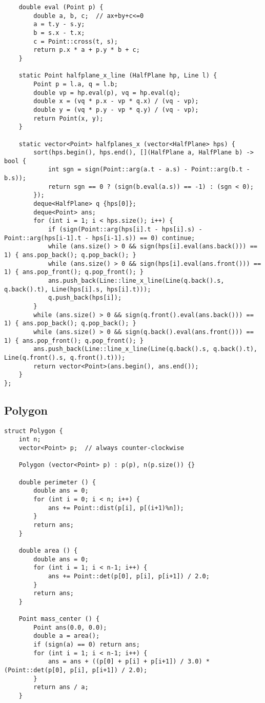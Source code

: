 \documentclass[10pt,landscape]{article}
\begin{document}
\begin{multicols}{2}
\begin{lstlisting}
	double eval (Point p) {
		double a, b, c;  // ax+by+c<=0
		a = t.y - s.y;
		b = s.x - t.x;
		c = Point::cross(t, s);
		return p.x * a + p.y * b + c;
	}

	static Point halfplane_x_line (HalfPlane hp, Line l) {
		Point p = l.a, q = l.b;
		double vp = hp.eval(p), vq = hp.eval(q);
		double x = (vq * p.x - vp * q.x) / (vq - vp);
		double y = (vq * p.y - vp * q.y) / (vq - vp);
		return Point(x, y);
	}

	static vector<Point> halfplanes_x (vector<HalfPlane> hps) {
		sort(hps.begin(), hps.end(), [](HalfPlane a, HalfPlane b) -> bool {
			int sgn = sign(Point::arg(a.t - a.s) - Point::arg(b.t - b.s));
			return sgn == 0 ? (sign(b.eval(a.s)) == -1) : (sgn < 0);
		});
		deque<HalfPlane> q {hps[0]};
		deque<Point> ans;
		for (int i = 1; i < hps.size(); i++) {
			if (sign(Point::arg(hps[i].t - hps[i].s) - Point::arg(hps[i-1].t - hps[i-1].s)) == 0) continue;
			while (ans.size() > 0 && sign(hps[i].eval(ans.back())) == 1) { ans.pop_back(); q.pop_back(); }
			while (ans.size() > 0 && sign(hps[i].eval(ans.front())) == 1) { ans.pop_front(); q.pop_front(); }
			ans.push_back(Line::line_x_line(Line(q.back().s, q.back().t), Line(hps[i].s, hps[i].t)));
			q.push_back(hps[i]);
		}
		while (ans.size() > 0 && sign(q.front().eval(ans.back())) == 1) { ans.pop_back(); q.pop_back(); }
		while (ans.size() > 0 && sign(q.back().eval(ans.front())) == 1) { ans.pop_front(); q.pop_front(); }
		ans.push_back(Line::line_x_line(Line(q.back().s, q.back().t), Line(q.front().s, q.front().t)));
		return vector<Point>(ans.begin(), ans.end());
	}
};
\end{lstlisting}
\subsection{Polygon}
\begin{lstlisting}
struct Polygon {
	int n;
	vector<Point> p;  // always counter-clockwise

	Polygon (vector<Point> p) : p(p), n(p.size()) {}

	double perimeter () {
		double ans = 0;
		for (int i = 0; i < n; i++) {
			ans += Point::dist(p[i], p[(i+1)%n]);
		}
		return ans;
	}

	double area () {
		double ans = 0;
		for (int i = 1; i < n-1; i++) {
			ans += Point::det(p[0], p[i], p[i+1]) / 2.0;
		}
		return ans;
	}

	Point mass_center () {
		Point ans(0.0, 0.0);
		double a = area();
		if (sign(a) == 0) return ans;
		for (int i = 1; i < n-1; i++) {
			ans = ans + ((p[0] + p[i] + p[i+1]) / 3.0) * (Point::det(p[0], p[i], p[i+1]) / 2.0);
		}
		return ans / a;
	}


\end{lstlisting}
\end{multicols}
\end{document}
